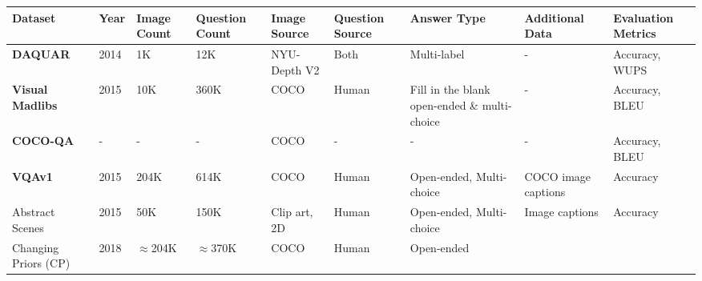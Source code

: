 \begin{landscape}
  \begin{center}
    \begin{xltabular}{\linewidth}{LLLLLLLLL}
      \toprule
      \textbf{Dataset}
      & \textbf{Year}
      & \textbf{Image Count}
      & \textbf{Question Count}
      & \textbf{Image Source}
      & \textbf{Question Source}
      & \textbf{Answer Type}
      & \textbf{Additional Data}
      & \textbf{Evaluation Metrics}\\
      \midrule
      \textbf{DAQUAR} \cite{malinowski2014multiworld}
      & 2014
      & 1K  %
      & 12K  %
      & NYU-Depth V2 \cite{silberman2012indoor}
      & Both
      & Multi-label  %
      & -
      & Accuracy, WUPS \\
      \textbf{Visual Madlibs} \cite{yu2015visual}
      & 2015
      & 10K  %
      & 360K  %
      & COCO \cite{lin2014microsoft}
      & Human
      & Fill in the blank open-ended \& multi-choice
      & -
      & Accuracy, BLEU \\
      \textbf{COCO-QA}
      & -
      & -
      & -
      & COCO
      & -
      & -
      & -
      & Accuracy, BLEU \\
      \textbf{VQAv1} \cite{antol2015vqa}
      & 2015
      & 204K  %
      & 614K  %
      & COCO
      & Human
      & Open-ended, Multi-choice
      & COCO image captions
      & Accuracy\footnotemark \\
      Abstract Scenes
      & 2015
      & 50K  %
      & 150K  %
      & Clip art, 2D
      & Human
      & Open-ended, Multi-choice
      & Image captions
      & Accuracy\footnotemark[\value{footnote}] \\
      Changing Priors (CP) \cite{agrawal2018dont}
      & 2018
      & {\color{red}\(\approx\)204K}  %
      & {\color{red}\(\approx\)370K}  %
      & COCO
      & Human
      & Open-ended

\end{xltabular}
\end{center}
\end{landscape}
